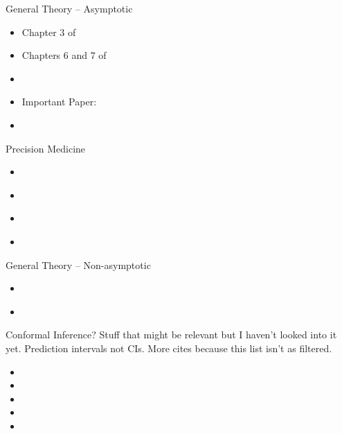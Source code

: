\documentclass[aspectratio=169, professionalfonts]{beamer}
\begin{document}
\begin{frame}{General Theory -- Asymptotic}
	\vfill
	\begin{itemize}
		\item Chapter 3 of \cite{tsiatis2006Semiparametric}
		      \vfill
		\item Chapters 6 and 7 of \cite{vandervaart2000Asymptotic}
		      \vfill
		\item \cite{kosorok2008Introduction}
		      \vfill
		\item Important Paper: \cite{hirano2012Impossibility}
		      \vfill


		\item 	\cite{bibaut2021PostContextualBandit}
		      \vfill
	\end{itemize}
\end{frame}

\begin{frame}{Precision Medicine}
	\vfill
	\begin{itemize}
		\item \cite{laber2014Dynamic}
		      \vfill

		\item 	\cite{luedtke2016Statistical}
		      \vfill

		\item 	\cite{shi2022Statistical}

		\item \cite{hadad2021Confidence}
	\end{itemize}
	\vfill

\end{frame}

\begin{frame}{General Theory -- Non-asymptotic}
	\vfill
	\begin{itemize}
		\item \cite{waudby-smith2022Anytimevalid}
		      \vfill

		      \item\cite{howard2021Timeuniform}
	\end{itemize}
	\vfill

\end{frame}
\begin{frame}{Conformal Inference?}
	Stuff that might be relevant but I haven't looked into it yet.
	Prediction intervals not CIs. More cites because this list isn't
	as filtered.
	\begin{itemize}
		\item {}
		      \vfill
		\item {}
		      \vfill
		\item {}
		      \vfill
		\item {}
		      \vfill
		\item {}
		      \vfill
	\end{itemize}
\end{frame}



\appendix
\printbibliography
\end{document}
